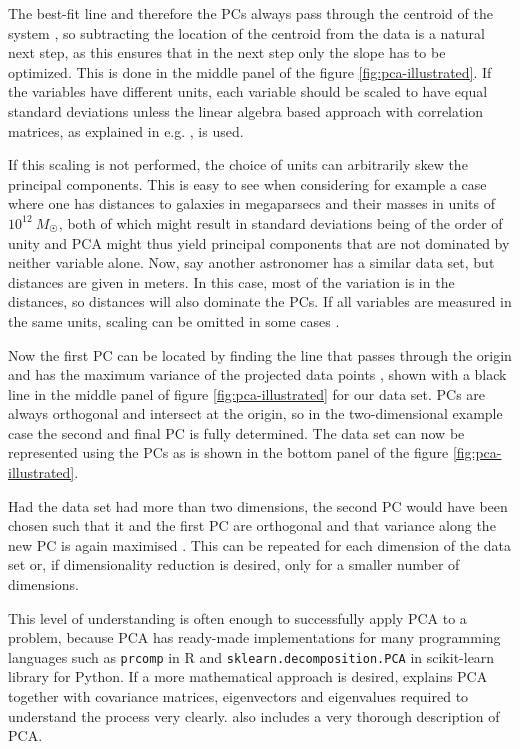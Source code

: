 \documentclass[english, oneside]{HYgradu}
\begin{document}
\reversemarginpar
{}
The best-fit line and therefore the PCs always pass through the centroid of the system \citep{pearson1901lines}, so subtracting the location of the centroid from the data is a natural next step, as this ensures that in the next step only the slope has to be optimized. This is done in the middle panel of the figure \ref{fig:pca-illustrated}. If the variables have different units, each variable should be scaled to have equal standard deviations \citep{james2013introduction} unless the linear algebra based approach with correlation matrices, as explained in e.g. \citep{jolliffe2002principal}, is used.

If this scaling is not performed, the choice of units can arbitrarily skew the principal components. This is easy to see when considering for example a case where one has distances to galaxies in megaparsecs and their masses in units of $10^{12}\ M_{\astrosun}$, both of which might result in standard deviations being of the order of unity and PCA might thus yield principal components that are not dominated by neither variable alone. Now, say another astronomer has a similar data set, but distances are given in meters. In this case, most of the variation is in the distances, so distances will also dominate the PCs. If all variables are measured in the same units, scaling can be omitted in some cases \citep{james2013introduction}.

Now the first PC can be located by finding the line that passes through the origin and has the maximum variance of the projected data points \citep{jolliffe2002principal}, shown with a black line in the middle panel of figure \ref{fig:pca-illustrated} for our data set. PCs are always orthogonal and intersect at the origin, so in the two-dimensional example case the second and final PC is fully determined. The data set can now be represented using the PCs as is shown in the bottom panel of the figure \ref{fig:pca-illustrated}.

Had the data set had more than two dimensions, the second PC would have been chosen such that it and the first PC are orthogonal and that variance along the new PC is again maximised \citep{jolliffe2002principal}. This can be repeated for each dimension of the data set or, if dimensionality reduction is desired, only for a smaller number of dimensions.

\reversemarginpar
{}
This level of understanding is often enough to successfully apply PCA to a problem, because PCA has ready-made implementations for many programming languages such as \texttt{prcomp} in R \citep{james2013introduction} and \texttt{sklearn.decomposition.PCA} in scikit-learn library \citep{scikit-learn} for Python. If a more mathematical approach is desired, \citet{smith2002tutorial} explains PCA together with covariance matrices, eigenvectors and eigenvalues required to understand the process very clearly. \citet{jolliffe2002principal} also includes a very thorough description of PCA.
\end{document}
